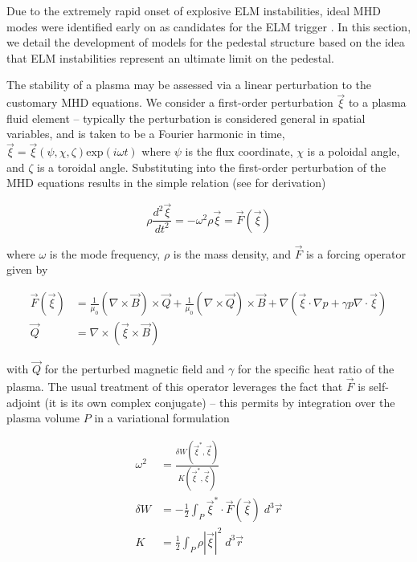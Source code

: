 Due to the extremely rapid onset of explosive ELM instabilities, ideal MHD modes were identified early on as candidates for the ELM trigger \cite{Wagner1982,Keilhacker1984,Huysmans2005}.  In this section, we detail the development of models for the pedestal structure based on the idea that ELM instabilities represent an ultimate limit on the pedestal.

The stability of a plasma may be assessed via a linear perturbation to the customary MHD equations.  We consider a first-order perturbation $\vec{\xi}$ to a plasma fluid element -- typically the perturbation is considered general in spatial variables, and is taken to be a Fourier harmonic in time, $\vec{\xi} = \vec{\xi}(\psi,\chi,\zeta) \mbox{exp}(i\omega t)$ where $\psi$ is the flux coordinate, $\chi$ is a poloidal angle, and $\zeta$ is a toroidal angle.  Substituting into the first-order perturbation of the MHD equations results in the simple relation (see \cite[\S 8]{Freidberg1987} for derivation)

\begin{equation}\label{eq:mhd_perturb}
 \rho \frac{d^2 \vec{\xi}}{dt^2} = -\omega^2 \rho \vec{\xi} = \vec{F}\left( \vec{\xi} \right)
\end{equation}

\noindent where $\omega$ is the mode frequency, $\rho$ is the mass density, and $\vec{F}$ is a forcing operator given by

\begin{equation}\label{eq:forcing}
 \begin{aligned}
  \vec{F}\left( \vec{\xi} \right) &= \frac{1}{\mu_0} \left( \nabla \times \vec{B} \right) \times \vec{Q} + \frac{1}{\mu_0} \left( \nabla \times \vec{Q} \right) \times \vec{B} + \nabla \left( \vec{\xi} \cdot \nabla p + \gamma p \nabla \cdot \vec{\xi} \right)\\
  \vec{Q} &= \nabla \times \left( \vec{\xi} \times \vec{B} \right)
 \end{aligned}
\end{equation}

\noindent with $\vec{Q}$ for the perturbed magnetic field and $\gamma$ for the specific heat ratio of the plasma.  The usual treatment of this operator leverages the fact that $\vec{F}$ is self-adjoint (\ie it is its own complex conjugate) -- this permits by integration over the plasma volume $P$ in a variational formulation

\begin{equation}\label{eq:energyprinciple}
 \begin{aligned}
  \omega^2 &= \frac{\delta W \left( \vec{\xi}^*,\vec{\xi} \right)}{K\left(\vec{\xi}^*,\vec{\xi} \right)}\\
  \delta W &= -\frac{1}{2} \int_P \vec{\xi}^* \cdot \vec{F} \left( \vec{\xi} \right) \;d^3 \vec{r}\\
  K &= \frac{1}{2} \int_P \rho \left| \vec{\xi} \right|^2 \;d^3 \vec{r}
 \end{aligned}
\end{equation}

